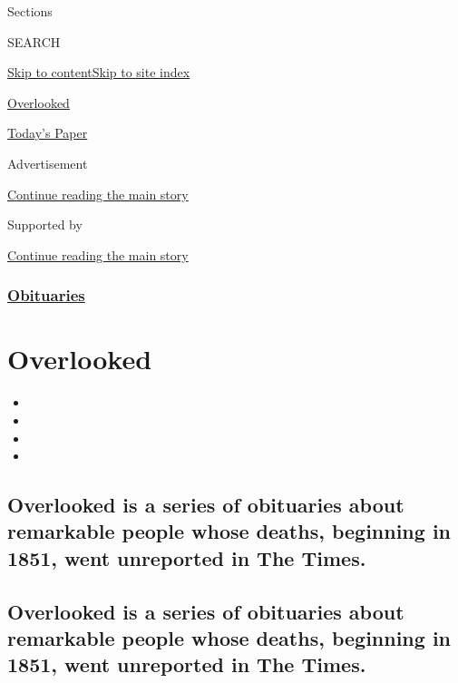 Sections

SEARCH

\protect\hyperlink{site-content}{Skip to
content}\protect\hyperlink{site-index}{Skip to site index}

\href{https://www.nytimes.com/spotlight/overlooked}{Overlooked}

\href{https://myaccount.nytimes.com/auth/login?response_type=cookie\&client_id=vi}{}

\href{https://www.nytimes.com/section/todayspaper}{Today's Paper}

Advertisement

\protect\hyperlink{after-top}{Continue reading the main story}

Supported by

\protect\hyperlink{after-sponsor}{Continue reading the main story}

\hypertarget{obituaries}{%
\subsubsection{\texorpdfstring{\href{/section/obituaries}{Obituaries}}{Obituaries}}\label{obituaries}}

\hypertarget{overlooked}{%
\section{Overlooked}\label{overlooked}}

\begin{itemize}
\item
\item
\item
\item
\end{itemize}

\hypertarget{overlooked-is-a-series-of-obituaries-about-remarkable-people-whose-deaths-beginning-in-1851-went-unreported-in-the-times}{%
\subsection{Overlooked is a series of obituaries about remarkable people
whose deaths, beginning in 1851, went unreported in The
Times.}\label{overlooked-is-a-series-of-obituaries-about-remarkable-people-whose-deaths-beginning-in-1851-went-unreported-in-the-times}}

\hypertarget{overlooked-is-a-series-of-obituaries-about-remarkable-people-whose-deaths-beginning-in-1851-went-unreported-in-the-times-1}{%
\subsection{Overlooked is a series of obituaries about remarkable people
whose deaths, beginning in 1851, went unreported in The
Times.}\label{overlooked-is-a-series-of-obituaries-about-remarkable-people-whose-deaths-beginning-in-1851-went-unreported-in-the-times-1}}

